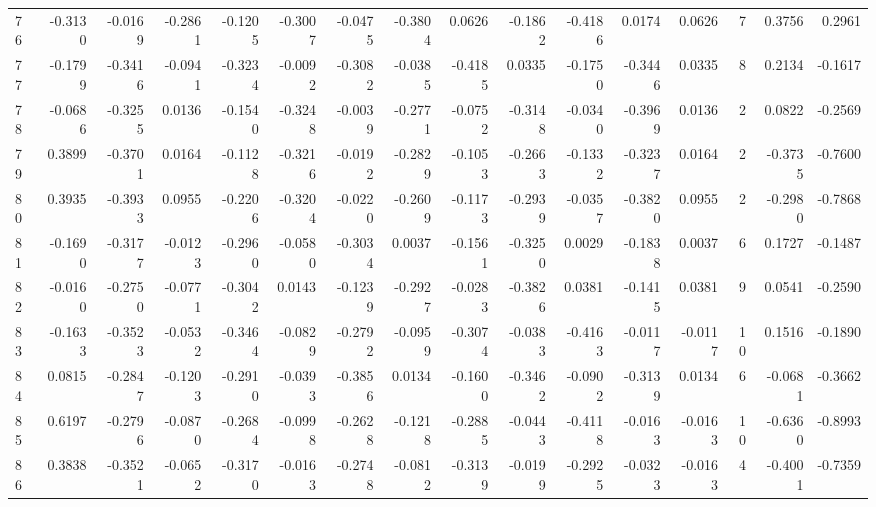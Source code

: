 \begin{tabular}{lrrrrrrrrrrrrrrr}
76  &     -0.3130 & -0.0169 & -0.2861 & -0.1205 & -0.3007 & -0.0475 & -0.3804 &  0.0626 & -0.1862 & -0.4186 &   0.0174 &     0.0626 &      7 &                    0.3756 &                     0.2961 \\
77  &     -0.1799 & -0.3416 & -0.0941 & -0.3234 & -0.0092 & -0.3082 & -0.0385 & -0.4185 &  0.0335 & -0.1750 &  -0.3446 &     0.0335 &      8 &                    0.2134 &                    -0.1617 \\
78  &     -0.0686 & -0.3255 &  0.0136 & -0.1540 & -0.3248 & -0.0039 & -0.2771 & -0.0752 & -0.3148 & -0.0340 &  -0.3969 &     0.0136 &      2 &                    0.0822 &                    -0.2569 \\
79  &      0.3899 & -0.3701 &  0.0164 & -0.1128 & -0.3216 & -0.0192 & -0.2829 & -0.1053 & -0.2663 & -0.1332 &  -0.3237 &     0.0164 &      2 &                   -0.3735 &                    -0.7600 \\
80  &      0.3935 & -0.3933 &  0.0955 & -0.2206 & -0.3204 & -0.0220 & -0.2609 & -0.1173 & -0.2939 & -0.0357 &  -0.3820 &     0.0955 &      2 &                   -0.2980 &                    -0.7868 \\
81  &     -0.1690 & -0.3177 & -0.0123 & -0.2960 & -0.0580 & -0.3034 &  0.0037 & -0.1561 & -0.3250 &  0.0029 &  -0.1838 &     0.0037 &      6 &                    0.1727 &                    -0.1487 \\
82  &     -0.0160 & -0.2750 & -0.0771 & -0.3042 &  0.0143 & -0.1239 & -0.2927 & -0.0283 & -0.3826 &  0.0381 &  -0.1415 &     0.0381 &      9 &                    0.0541 &                    -0.2590 \\
83  &     -0.1633 & -0.3523 & -0.0532 & -0.3464 & -0.0829 & -0.2792 & -0.0959 & -0.3074 & -0.0383 & -0.4163 &  -0.0117 &    -0.0117 &     10 &                    0.1516 &                    -0.1890 \\
84  &      0.0815 & -0.2847 & -0.1203 & -0.2910 & -0.0393 & -0.3856 &  0.0134 & -0.1600 & -0.3462 & -0.0902 &  -0.3139 &     0.0134 &      6 &                   -0.0681 &                    -0.3662 \\
85  &      0.6197 & -0.2796 & -0.0870 & -0.2684 & -0.0998 & -0.2628 & -0.1218 & -0.2885 & -0.0443 & -0.4118 &  -0.0163 &    -0.0163 &     10 &                   -0.6360 &                    -0.8993 \\
86  &      0.3838 & -0.3521 & -0.0652 & -0.3170 & -0.0163 & -0.2748 & -0.0812 & -0.3139 & -0.0199 & -0.2925 &  -0.0323 &    -0.0163 &      4 &                   -0.4001 &                    -0.7359 \\

\end{tabular}
